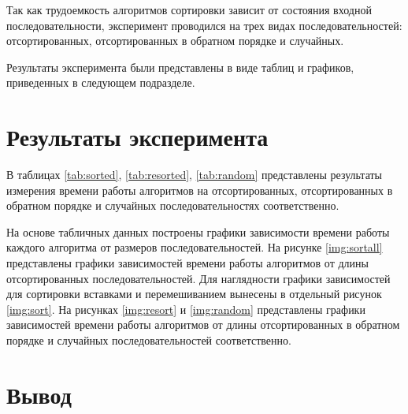 Так как трудоемкость алгоритмов сортировки зависит от состояния входной
последовательности, эксперимент проводился на трех видах последовательностей:
отсортированных, отсортированных в обратном порядке и случайных.

Результаты эксперимента были представлены в виде таблиц и графиков, приведенных
в следующем подразделе.

\section{Результаты эксперимента}

В таблицах \ref{tab:sorted}, \ref{tab:resorted}, \ref{tab:random} представлены
результаты измерения времени работы алгоритмов на отсортированных,
отсортированных в обратном порядке и случайных последовательностях
соответственно.

На основе табличных данных построены графики зависимости времени работы каждого
алгоритма от размеров последовательностей. На рисунке \ref{img:sortall}
представлены графики зависимостей времени работы алгоритмов от длины
отсортированных последовательностей. Для наглядности графики зависимостей для
сортировки вставками и перемешиванием вынесены в отдельный рисунок
\ref{img:sort}. На рисунках \ref{img:resort} и \ref{img:random} представлены
графики зависимостей времени работы алгоритмов от длины отсортированных в
обратном порядке и случайных последовательностей соответственно.




\clearpage
{}

\clearpage
{}

\section{Вывод}

